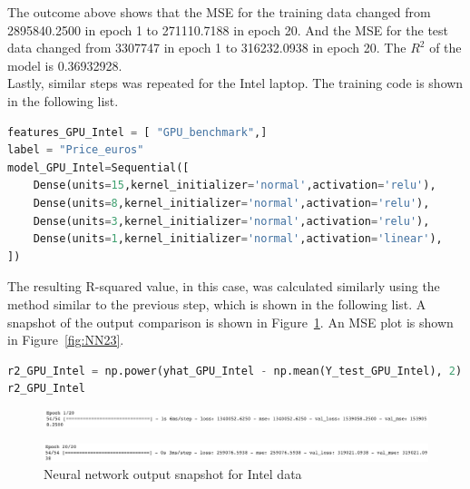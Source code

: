 \documentclass{scrartcl}
\begin{document}
\noindent The outcome above shows that the MSE for the training data changed from 2895840.2500 in epoch 1 to 271110.7188 in epoch 20. And the MSE for the test data changed from 3307747 in epoch 1 to 316232.0938 in epoch 20. The $R^2$ of the model is 0.36932928. \\








\noindent Lastly, similar steps was repeated for the Intel laptop. The training code is shown in the following list. 

\begin{lstlisting}[language=Python, caption= Code for training Intel data, basicstyle=\tiny,captionpos=b]
features_GPU_Intel = [ "GPU_benchmark",]
label = "Price_euros"
model_GPU_Intel=Sequential([
    Dense(units=15,kernel_initializer='normal',activation='relu'),
    Dense(units=8,kernel_initializer='normal',activation='relu'),
    Dense(units=3,kernel_initializer='normal',activation='relu'),
    Dense(units=1,kernel_initializer='normal',activation='linear'),
])
\end{lstlisting}

\noindent The resulting R-squared value, in this case, was calculated similarly using the method similar to the previous step, which is shown in the following list. A snapshot of the output comparison is shown in Figure~\ref{fig:NN24-25}. An MSE plot is shown in Figure~\ref{fig:NN23}. \\

\begin{lstlisting}[language=Python, caption= Code output for MSE Intel training,basicstyle=\tiny,captionpos=b]
r2_GPU_Intel = np.power(yhat_GPU_Intel - np.mean(Y_test_GPU_Intel), 2).sum() / np.power(Y_test_GPU_Intel - np.mean(Y_test_GPU_Intel), 2).sum()
r2_GPU_Intel

\end{lstlisting}

\begin{figure}[H]
         \centering
         \includegraphics[width=\textwidth]{Graphics/Neural Network Images/NN24.png}
\end{figure}
     
\begin{figure}[H]
         \centering
         \includegraphics[width=\textwidth]{Graphics/Neural Network Images/NN25.png}
         \caption{Neural network output snapshot for Intel data}
         \label{fig:NN24-25}
\end{figure}
\end{document}
